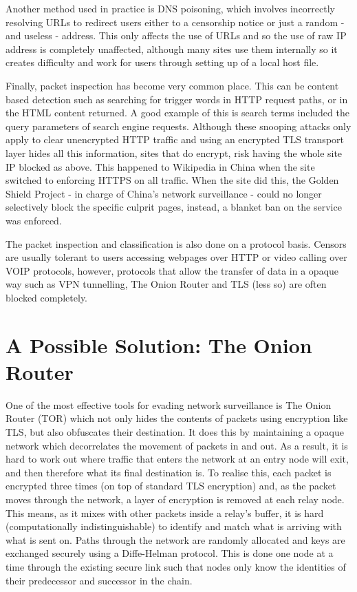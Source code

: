 \documentclass[ %
                    author={Samuel Russell},
                supervisor={Prof. Bogdan Warinschi},
                    degree={MEng},
                     title={Innocuous Ciphertexts},
                  subtitle={The DE-CENSOR Scheme},
                      type={research},
                      year={2018} ]{dissertation}
\begin{document}
Another method used in practice is DNS poisoning, which involves incorrectly resolving URLs to redirect users either to a censorship notice or just a random - and useless - address. This only affects the use of URLs and so the use of raw IP address is completely unaffected, although many sites use them internally so it creates difficulty and work for users through setting up of a local host file.

Finally, packet inspection has become very common place. This can be content based detection such as searching for trigger words in HTTP request paths, or in the HTML content returned. A good example of this is search terms included the query parameters of  search engine requests. Although these snooping attacks only apply to clear unencrypted HTTP traffic and using an encrypted  TLS transport layer hides all this information, sites that do encrypt, risk having the whole site IP blocked as above. This happened to Wikipedia in China when the site switched to enforcing HTTPS on all traffic. When the site did this, the Golden Shield Project - in charge of China's network surveillance - could no longer selectively block the specific culprit pages, instead, a blanket ban on the service was enforced.

The packet inspection and classification is also done on a protocol basis. Censors are usually tolerant to users accessing webpages over HTTP or video calling over VOIP protocols, however, protocols that allow the transfer of data in a opaque way such as VPN tunnelling, The Onion Router and TLS (less so) are often blocked completely.

\section{A Possible Solution: The Onion Router}

One of the most effective tools for evading network surveillance is The Onion Router (TOR) which not only hides the contents of packets using encryption like TLS, but also obfuscates their destination. It does this by maintaining a opaque network which decorrelates the movement of packets in and out. As a result, it is hard to work out where traffic that enters the network at an entry node will exit, and then therefore what its final destination is. To realise this, each packet is encrypted three times (on top of standard TLS encryption) and, as the packet moves through the network, a layer of encryption is removed at each relay node. This means, as it mixes with other packets inside a relay's buffer, it is hard (computationally indistinguishable) to identify and match what is arriving with what is sent on. Paths through the network are randomly allocated and keys are exchanged securely using a Diffe-Helman protocol. This is done one node at a time through the existing secure link such that nodes only know the identities of their predecessor and successor in the chain.
\end{document}
